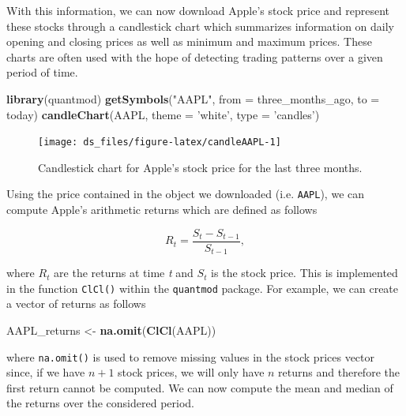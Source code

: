 \documentclass[12pt,]{krantz}
\newenvironment{Shaded}{\begin{snugshade}}{\end{snugshade}}
\newcommand{\KeywordTok}[1]{\textcolor[rgb]{0.27,0.27,0.27}{\textbf{#1}}}
\newcommand{\DataTypeTok}[1]{\textcolor[rgb]{0.27,0.27,0.27}{#1}}
\newcommand{\StringTok}[1]{\textcolor[rgb]{0.5,0.5,0.5}{#1}}
\newcommand{\NormalTok}[1]{#1}
\begin{document}
With this information, we can now download Apple's stock price and
represent these stocks through a candlestick chart which summarizes
information on daily opening and closing prices as well as minimum and
maximum prices. These charts are often used with the hope of detecting
trading patterns over a given period of time.

\begin{Shaded}
\begin{Highlighting}[]
\KeywordTok{library}\NormalTok{(quantmod)}
\KeywordTok{getSymbols}\NormalTok{(}\StringTok{"AAPL"}\NormalTok{, }\DataTypeTok{from =}\NormalTok{ three_months_ago, }\DataTypeTok{to =}\NormalTok{ today)}
\KeywordTok{candleChart}\NormalTok{(AAPL, }\DataTypeTok{theme =} \StringTok{'white'}\NormalTok{, }\DataTypeTok{type =} \StringTok{'candles'}\NormalTok{)}
\end{Highlighting}
\end{Shaded}

\begin{figure}

{\centering \texttt{[image: ds\_files/figure-latex/candleAAPL-1]} 

}

\caption{Candlestick chart for Apple's stock price for the last three months.}\label{fig:candleAAPL}
\end{figure}

Using the price contained in the object we downloaded (i.e.
\texttt{AAPL}), we can compute Apple's arithmetic returns which are
defined as follows

\begin{equation}
  R_t = \frac{S_t - S_{t-1}}{S_{t-1}},
    \label{eq:returns}
\end{equation}

where \(R_t\) are the returns at time \emph{t} and \(S_t\) is the stock
price. This is implemented in the function \texttt{ClCl()} within the
\texttt{quantmod} package. For example, we can create a vector of
returns as follows

\begin{Shaded}
\begin{Highlighting}[]
\NormalTok{AAPL_returns <-}\StringTok{ }\KeywordTok{na.omit}\NormalTok{(}\KeywordTok{ClCl}\NormalTok{(AAPL))}
\end{Highlighting}
\end{Shaded}

where \texttt{na.omit()} is used to remove missing values in the stock
prices vector since, if we have \(n+1\) stock prices, we will only have
\(n\) returns and therefore the first return cannot be computed. We can
now compute the mean and median of the returns over the considered
period.
\end{document}
